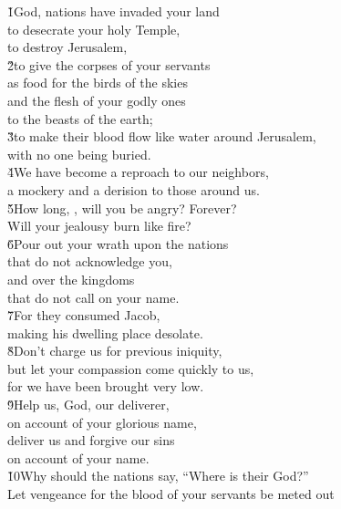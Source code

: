 \begin{poetry}
\poeml \v{1}God, nations have invaded your land \\
\poemll    to desecrate your holy Temple, \\
\poemlll       to destroy Jerusalem, \\
\poeml \v{2}to give the corpses of your servants \\
\poemll    as food for the birds of the skies \\
\poeml and the flesh of your godly ones \\
\poemll    to the beasts of the earth; \\
\poeml \v{3}to make their blood flow like water around Jerusalem, \\
\poemll    with no one being buried. \\
\poeml \v{4}We have become a reproach to our neighbors, \\
\poemll    a mockery and a derision to those around us. \\
\poeml \v{5}How long, , will you be angry? Forever? \\
\poemll    Will your jealousy burn like fire? \\
\poeml \v{6}Pour out your wrath upon the nations \\
\poemll    that do not acknowledge you, \\
\poeml and over the kingdoms \\
\poemll    that do not call on your name. \\
\poemll    \v{7}For they consumed Jacob, \\
\poemll    making his dwelling place desolate. \\
\poeml \v{8}Don't charge us for previous iniquity, \\
\poemll    but let your compassion come quickly to us, \\
\poemlll       for we have been brought very low. \\
\poeml \v{9}Help us, God, our deliverer, \\
\poemll    on account of your glorious name, \\
\poeml deliver us and forgive our sins \\
\poemll    on account of your name. \\
\poeml \v{10}Why should the nations say, ``Where is their God?'' \\
\poemll    Let vengeance for the blood of your servants be meted out \\

\end{poetry}
